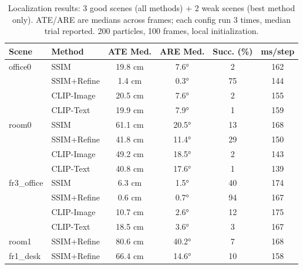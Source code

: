\begin{table}[t]
\centering
\small
\begin{tabular}{@{}llcccc@{}}
\toprule
\textbf{Scene} & \textbf{Method} & \textbf{ATE Med.} & \textbf{ARE Med.} & \textbf{Succ. (\%)} & \textbf{ms/step} \\
\midrule
  office0 & SSIM & 19.8 cm & 7.6° & 2 & 162 \\
   & SSIM+Refine & 1.4 cm & 0.3° & 75 & 144 \\
   & CLIP-Image & 20.5 cm & 7.6° & 2 & 155 \\
   & CLIP-Text & 19.9 cm & 7.9° & 1 & 159 \\
  room0 & SSIM & 61.1 cm & 20.5° & 13 & 168 \\
   & SSIM+Refine & 41.8 cm & 11.4° & 29 & 150 \\
   & CLIP-Image & 49.2 cm & 18.5° & 2 & 143 \\
   & CLIP-Text & 40.8 cm & 17.6° & 1 & 139 \\
  fr3_office & SSIM & 6.3 cm & 1.5° & 40 & 174 \\
   & SSIM+Refine & 0.6 cm & 0.7° & 94 & 167 \\
   & CLIP-Image & 10.7 cm & 2.6° & 12 & 175 \\
   & CLIP-Text & 18.5 cm & 3.6° & 3 & 167 \\
  room1 & SSIM+Refine & 80.6 cm & 40.2° & 7 & 168 \\
  fr1_desk & SSIM+Refine & 66.4 cm & 14.6° & 10 & 158 \\
\bottomrule
\end{tabular}
\caption{Localization results: 3 good scenes (all methods) + 2 weak scenes (best method only). ATE/ARE are medians across frames; each config run 3 times, median trial reported. 200 particles, 100 frames, local initialization.}
\end{table}